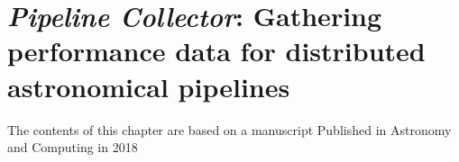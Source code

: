 

\chapter[Pipeline Collector]{\textit{Pipeline Collector}: Gathering performance data for distributed astronomical pipelines}\label{ch:pipeline_collector}


\author{Alexandar P. Mechev$^a$ }

\author{Aske Plaat$^b$}%
\author{J.B. Raymond Oonk$^a$$^,$$^c$}%
\author{Huib T. Intema$^a$}%
\author{Huub J.A. R\"ottgering$^a$}%

\date{\today}%

\begin{frshaded*}
    The contents of this chapter are based on a manuscript Published in Astronomy and Computing in 2018
\end{frshaded*}
%


